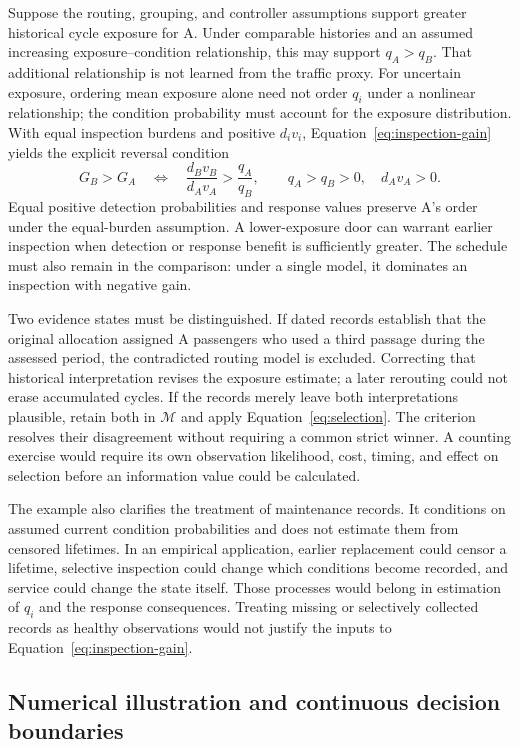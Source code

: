 \documentclass[symmetry,article,submit,pdftex,oneauthor]{Definitions/mdpi}
\begin{document}
Suppose the routing, grouping, and controller assumptions support greater historical cycle exposure for A. Under comparable histories and an assumed increasing exposure--condition relationship, this may support $q_A>q_B$. That additional relationship is not learned from the traffic proxy. For uncertain exposure, ordering mean exposure alone need not order $q_i$ under a nonlinear relationship; the condition probability must account for the exposure distribution. With equal inspection burdens and positive $d_i v_i$, Equation~\ref{eq:inspection-gain} yields the explicit reversal condition
\begin{equation}
G_B>G_A
\quad\Longleftrightarrow\quad
\frac{d_Bv_B}{d_Av_A}>\frac{q_A}{q_B},
\qquad q_A>q_B>0,\quad d_Av_A>0.
\label{eq:reversal}
\end{equation}
Equal positive detection probabilities and response values preserve A's order under the equal-burden assumption. A lower-exposure door can warrant earlier inspection when detection or response benefit is sufficiently greater. The schedule must also remain in the comparison: under a single model, it dominates an inspection with negative gain.

Two evidence states must be distinguished. If dated records establish that the original allocation assigned A passengers who used a third passage during the assessed period, the contradicted routing model is excluded. Correcting that historical interpretation revises the exposure estimate; a later rerouting could not erase accumulated cycles. If the records merely leave both interpretations plausible, retain both in $\mathcal M$ and apply Equation~\ref{eq:selection}. The criterion resolves their disagreement without requiring a common strict winner. A counting exercise would require its own observation likelihood, cost, timing, and effect on selection before an information value could be calculated.

The example also clarifies the treatment of maintenance records. It conditions on assumed current condition probabilities and does not estimate them from censored lifetimes. In an empirical application, earlier replacement could censor a lifetime, selective inspection could change which conditions become recorded, and service could change the state itself. Those processes would belong in estimation of $q_i$ and the response consequences. Treating missing or selectively collected records as healthy observations would not justify the inputs to Equation~\ref{eq:inspection-gain}.

\subsection{Numerical illustration and continuous decision boundaries}
\label{sec:numerical}
\end{document}
